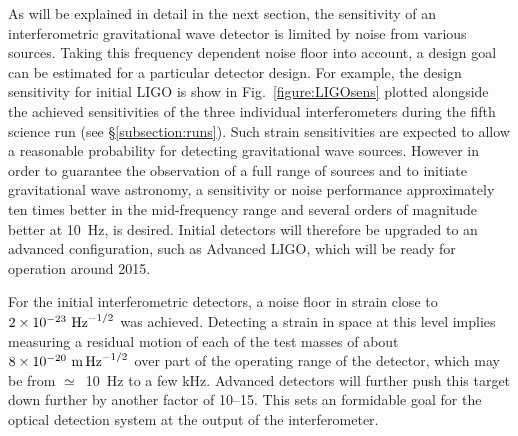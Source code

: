 \documentclass{article}
\begin{document}
As will be explained in detail in the next section, the sensitivity of an
interferometric gravitational wave detector is limited by noise from various
sources. Taking this frequency dependent noise floor into account, a design goal
can be estimated for a particular detector design. For example, the design
sensitivity for initial LIGO is show in Fig.~\ref{figure:LIGOsens} plotted
alongside the achieved sensitivities of the three individual interferometers
during the fifth science run (see \S\ref{subsection:runs}). Such strain
sensitivities are expected to allow a reasonable probability for detecting
gravitational wave sources. However in order to guarantee the observation
of a full range of sources and to initiate gravitational wave astronomy, a
sensitivity or noise performance approximately ten times better in the
mid-frequency range and several orders of magnitude better at 10~Hz, is desired.
Initial detectors will therefore be upgraded to an advanced configuration, such
as Advanced LIGO, which will be ready for operation around 2015.


For the initial interferometric detectors, a noise floor in strain close to $2
\times 10^{-23}~{\rm Hz}^{-1/2}$ was achieved. Detecting a strain in space at
this level implies measuring a residual motion of each of the test masses of
about $8 \times 10^{-20}~{\rm m}\,{\rm Hz}^{-1/2}$ over part of the operating
range of the detector, which may be from $\simeq$~10~Hz to a few kHz. Advanced
detectors will further push this target down further by another factor of
10--15. This sets an formidable goal for the optical detection system at the
output of the interferometer.
\end{document}
